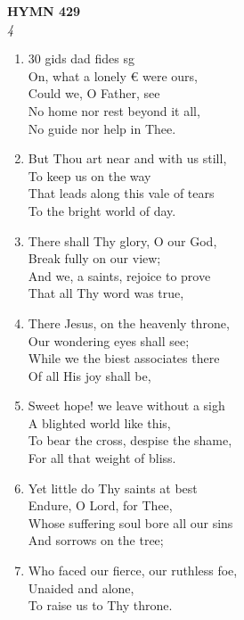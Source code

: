 \documentclass[11pt,a4paper]{article}
\begin{document}
\newpage
\begin{center}
    {\Large \textbf{HYMN 429}}
    \\
    \textit{4}
\end{center}
\vspace{1em}

\begin{enumerate}
    \item 30 gids dad fides sg \\
        On, what a lonely € were ours, \\
        Could we, O Father, see \\
        No home nor rest beyond it all, \\
        No guide nor help in Thee.

    \item But Thou art near and with us still, \\
        To keep us on the way \\
        That leads along this vale of tears \\
        To the bright world of day.

    \item There shall Thy glory, O our God, \\
        Break fully on our view; \\
        And we, a saints, rejoice to prove \\
        That all Thy word was true,

    \item There Jesus, on the heavenly throne, \\
        Our wondering eyes shall see; \\
        While we the biest associates there \\
        Of all His joy shall be,

    \item Sweet hope! we leave without a sigh \\
        A blighted world like this, \\
        To bear the cross, despise the shame, \\
        For all that weight of bliss.

    \item Yet little do Thy saints at best \\
        Endure, O Lord, for Thee, \\
        Whose suffering soul bore all our sins \\
        And sorrows on the tree;

    \item Who faced our fierce, our ruthless foe, \\
        Unaided and alone, \\
        To raise us to Thy throne.

\end{enumerate}
\end{document}
